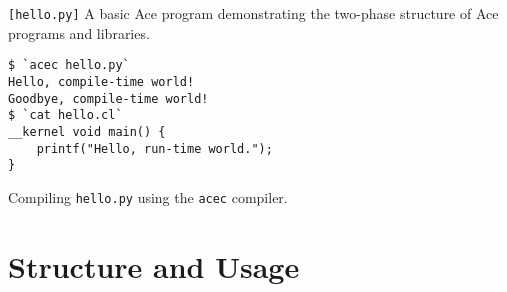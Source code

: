 \documentclass{sig-alternate}
\begin{document}
%

\begin{codelisting}

\caption{\texttt{[hello.py]} A basic Ace program demonstrating the two-phase structure of Ace programs and libraries.}
\label{hello}
\end{codelisting}
\begin{codelisting}
\begin{lstlisting}[style=Bash]
$ `acec hello.py`
Hello, compile-time world!
Goodbye, compile-time world!
$ `cat hello.cl`
__kernel void main() {
    printf("Hello, run-time world.");
}\end{lstlisting}
\caption{Compiling \texttt{hello.py} using the \texttt{acec} compiler.}
\label{helloout}
\end{codelisting}

\section{Structure and Usage}
\end{document}
